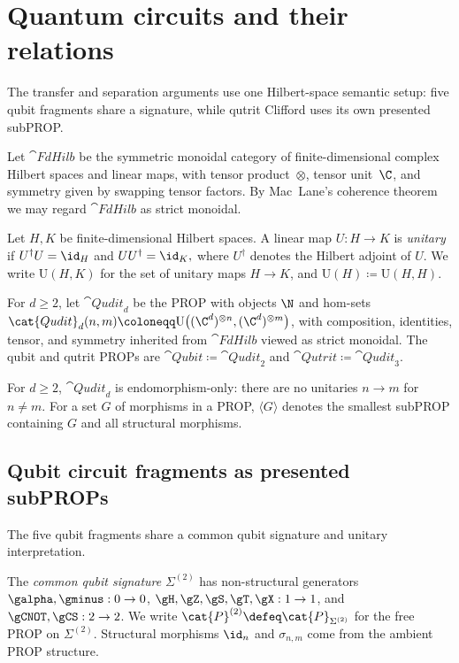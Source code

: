 \section{Quantum circuits and their relations}
\label{sec:circuits-relations}

The transfer and separation arguments use one Hilbert-space semantic setup: five qubit fragments
share a signature, while qutrit Clifford uses its own presented subPROP.

Let \(\cat{FdHilb}\) be the symmetric monoidal category of finite-dimensional
complex Hilbert spaces and linear maps, with tensor product~\(\otimes\), tensor
unit~\(\C\), and symmetry given by swapping tensor factors.  By Mac~Lane's
coherence theorem \cite{Saunders} we may regard \(\cat{FdHilb}\) as strict monoidal.

\begin{definition}\label{def:unitary}
Let \(H,K\) be finite-dimensional Hilbert spaces. A linear map \(U:H\to K\) is \emph{unitary} if
\(
  U^\dagger U = \id_H
\) and \(
  UU^\dagger = \id_K,
\)
where \(U^\dagger\) denotes the Hilbert adjoint of \(U\).
We write \(\mathrm{U}(H,K)\) for the set of unitary maps \(H\to K\), and \(\mathrm{U}(H)\coloneqq \mathrm{U}(H,H)\).
\end{definition}

\begin{definition}\label{def:qubit-qutrit-props}
For \(d\ge 2\), let \(\cat{Qudit}_d\) be the PROP with objects \(\N\) and
hom-sets \(\cat{Qudit}_d(n,m)\coloneqq
\mathrm{U}\big((\C^d)^{\otimes n},(\C^d)^{\otimes m}\big)\), with composition,
identities, tensor, and symmetry inherited from \(\cat{FdHilb}\) viewed as
strict monoidal.  The qubit and qutrit PROPs are
\(\cat{Qubit}\coloneqq\cat{Qudit}_2\) and
\(\cat{Qutrit}\coloneqq\cat{Qudit}_3\).
\end{definition}
For \(d\ge2\), \(\cat{Qudit}_d\) is endomorphism-only: there are no unitaries
\(n\to m\) for \(n\neq m\).
For a set \(G\) of morphisms in a PROP, \(\langle G\rangle\) denotes the smallest subPROP
containing \(G\) and all structural morphisms.

\subsection{Qubit circuit fragments as presented subPROPs}

The five qubit fragments share a common qubit signature and unitary interpretation.

\begin{definition}
The \emph{common qubit signature} \(\Sigma^{(2)}\) has non-structural generators
\(\galpha,\gminus:0\to0\),
\(\gH,\gZ,\gS,\gT,\gX:1\to1\), and \(\gCNOT,\gCS:2\to2\).
We write \(\cat{P}^{(2)}\defeq\cat{P}_{\Sigma^{(2)}}\) for the free PROP on
\(\Sigma^{(2)}\).  Structural morphisms \(\id_n\) and \(\sigma_{n,m}\) come from the
ambient PROP structure.
\end{definition}

